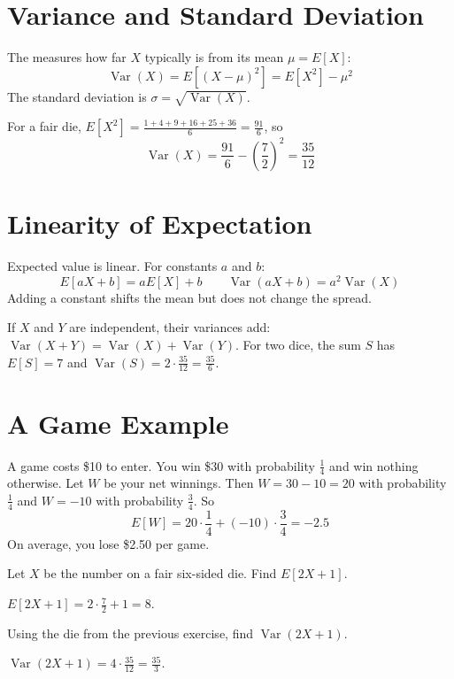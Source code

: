\section{Variance and Standard Deviation}
The  measures how far $X$ typically is from its mean $\mu = E[X]$:
$$\operatorname{Var}(X) = E[(X - \mu)^2] = E[X^2] - \mu^2$$
The standard deviation is $\sigma = \sqrt{\operatorname{Var}(X)}$.

For a fair die, $E[X^2] = \frac{1 + 4 + 9 + 16 + 25 + 36}{6} = \frac{91}{6}$, so
$$\operatorname{Var}(X) = \frac{91}{6} - \left(\frac{7}{2}\right)^2 = \frac{35}{12}$$

\section{Linearity of Expectation}
Expected value is linear. For constants $a$ and $b$:
$$E[aX + b] = aE[X] + b \qquad \operatorname{Var}(aX + b) = a^2\operatorname{Var}(X)$$
Adding a constant shifts the mean but does not change the spread.

If $X$ and $Y$ are independent, their variances add:
$\operatorname{Var}(X + Y) = \operatorname{Var}(X) + \operatorname{Var}(Y)$.
For two dice, the sum $S$ has $E[S] = 7$ and $\operatorname{Var}(S) = 2 \cdot \frac{35}{12} = \frac{35}{6}$.

\section{A Game Example}
A game costs \$10 to enter. You win \$30 with probability $\frac{1}{4}$ and win
nothing otherwise. Let $W$ be your net winnings. Then $W = 30 - 10 = 20$ with
probability $\frac{1}{4}$ and $W = -10$ with probability $\frac{3}{4}$. So
$$E[W] = 20 \cdot \frac{1}{4} + (-10) \cdot \frac{3}{4} = -2.5$$
On average, you lose \$2.50 per game.

\begin{Exercise}[label=rv1, title=Expected value of a die]
Let $X$ be the number on a fair six-sided die. Find $E[2X + 1]$.
\end{Exercise}
\begin{Answer}[ref=rv1]
$E[2X + 1] = 2 \cdot \frac{7}{2} + 1 = 8$.
\end{Answer}

\begin{Exercise}[label=rv2, title=Variance after scaling]
Using the die from the previous exercise, find $\operatorname{Var}(2X + 1)$.
\end{Exercise}
\begin{Answer}[ref=rv2]
$\operatorname{Var}(2X + 1) = 4 \cdot \frac{35}{12} = \frac{35}{3}$.
\end{Answer}

